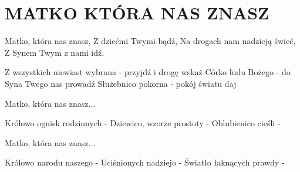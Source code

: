 \documentclass[../../../songbook.tex]{subfiles}
\begin{document}
\TabPositions{7cm} %
\section*{MATKO KTÓRA NAS ZNASZ}
{}
\vspace{0.5cm}
\setlength{\columnsep}{2cm}

{\footnotesize
\-\hspace{1cm} Matko, która nas znasz,				 \newline	
\-\hspace{1cm} Z dziećmi Twymi bądź,				 \newline	
\-\hspace{1cm} Na drogach nam nadzieją świeć,		 \newline	
\-\hspace{1cm} Z Synem Twym z nami idź.				 \newline	

Z wszystkich niewiast wybrana - 		 \newline	
przyjdź i drogę wskaż	 \newline	
Córko ludu Bożego - 					 \newline	
do Syna Twego nas prowadź \newline	
Służebnico pokorna -					 \newline	
pokój światu daj 		 \newline	
	
\-\hspace{1cm} Matko, która nas znasz...				 \newline
\begin{multicols}{2}			
Królowo ognisk rodzinnych -				 \newline
Dziewico, wzorze prostoty -				 \newline
Oblubienico cieśli -				 \newline
	
\-\hspace{1cm} Matko, która nas znasz...				 \newline
	
Królowo narodu naszego -				 \newline
Uciśnionych nadziejo -				 \newline
Światło łaknących prawdy -				 \newline
	

\end{multicols}}
\end{document}
